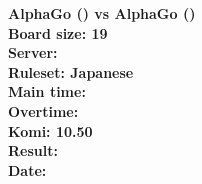 \documentclass{article}
\begin{document}
\begin{titlepage}
    \null
    \vfill
    \begin{center}
        \textbf{AlphaGo () vs AlphaGo ()}\\
        \textbf{Board size: 19}\\
        \textbf{Server: }\\
        \textbf{Ruleset: Japanese}\\
        \textbf{Main time: }\\
        \textbf{Overtime: }\\
        \textbf{Komi: 10.50}\\
        \textbf{Result: }\\
        \textbf{Date: }
    \end{center}
    \vfill
\end{titlepage}
\newpage
\tableofcontents
\end{document}
